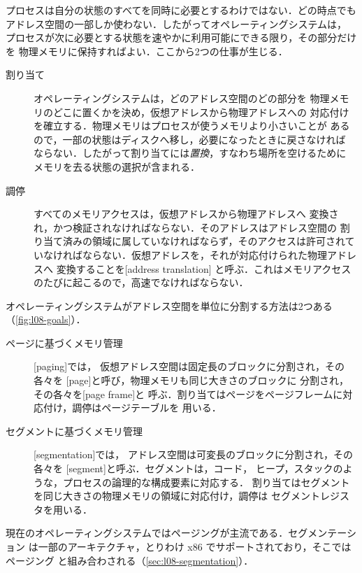 \documentclass[../main.tex]{subfiles}
\begin{document}
プロセスは自分の状態のすべてを同時に必要とするわけではない．どの時点でも
アドレス空間の一部しか使わない．したがってオペレーティングシステムは，
プロセスが次に必要とする状態を速やかに利用可能にできる限り，その部分だけを
物理メモリに保持すればよい．ここから2つの仕事が生じる．
\begin{description}
  \item[割り当て] オペレーティングシステムは，どのアドレス空間のどの部分を
    物理メモリのどこに置くかを決め，仮想アドレスから物理アドレスへの
    対応付けを確立する．物理メモリはプロセスが使うメモリより小さいことが
    あるので，一部の状態はディスクへ移し，必要になったときに戻さなければ
    ならない．したがって割り当てには\emph{置換}，すなわち場所を空けるために
    メモリを去る状態の選択が含まれる．
  \item[調停] すべてのメモリアクセスは，仮想アドレスから物理アドレスへ
    変換され，かつ検証されなければならない．そのアドレスはアドレス空間の
    割り当て済みの領域に属していなければならず，そのアクセスは許可されて
    いなければならない．仮想アドレスを，それが対応付けられた物理アドレスへ
    変換することを[address translation]
    と呼ぶ．これはメモリアクセスのたびに起こるので，高速でなければならない．
\end{description}

オペレーティングシステムがアドレス空間を単位に分割する方法は2つある
（\cref{fig:l08-goals}）．
\begin{description}
  \item[ページに基づくメモリ管理] [paging]では，
    仮想アドレス空間は固定長のブロックに分割され，その各々を
    [page]と呼び，物理メモリも同じ大きさのブロックに
    分割され，その各々を[page frame]と
    呼ぶ．割り当てはページをページフレームに対応付け，調停はページテーブルを
    用いる．
  \item[セグメントに基づくメモリ管理]
    [segmentation]では，
    アドレス空間は可変長のブロックに分割され，その各々を
    [segment]と呼ぶ．セグメントは，コード，
    ヒープ，スタックのような，プロセスの論理的な構成要素に対応する．
    割り当てはセグメントを同じ大きさの物理メモリの領域に対応付け，調停は
    セグメントレジスタを用いる．
\end{description}
現在のオペレーティングシステムではページングが主流である．セグメンテーション
は一部のアーキテクチャ，とりわけ x86 でサポートされており，そこではページング
と組み合わされる（\cref{sec:l08-segmentation}）．
\end{document}
